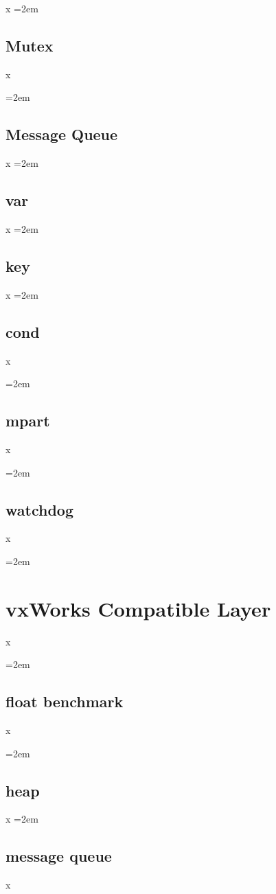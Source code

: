 \documentclass[a4paper]{article}
\let\oldsection\section
\renewcommand{\section}{\leftskip=2em \oldsection}
\let\oldsubsection\subsection
\renewcommand{\subsection}{\leftskip=2em \oldsubsection}
\begin{document}
x
\subsection{Mutex}
x

\subsection{Message Queue}

x
\subsection{var}

x
\subsection{key}

x
\subsection{cond}
x

\subsection{mpart}
x

\subsection{watchdog}

x

\newpage
\section{vxWorks Compatible Layer}
x

\subsection{float benchmark}
x

\subsection{heap}

x
\subsection{message queue}
x
\end{document}
